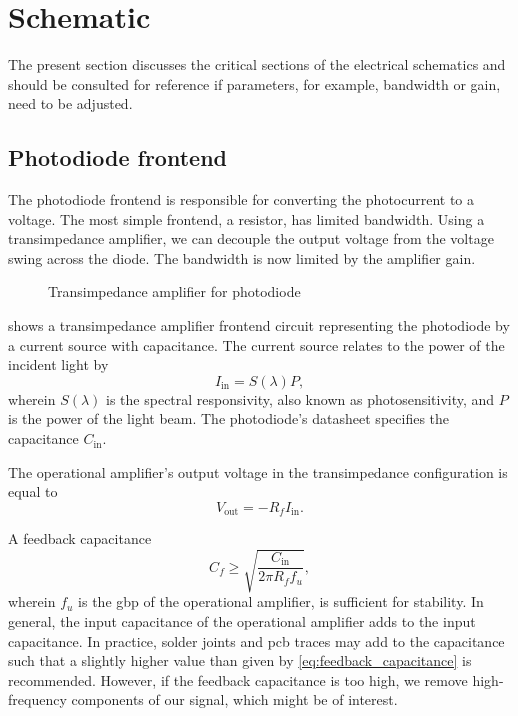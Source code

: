 \section{Schematic}

The present section discusses the critical sections of the electrical schematics and should be consulted for reference if parameters, for example, bandwidth or gain, need to be adjusted.

\subsection{Photodiode frontend}

The photodiode frontend is responsible for converting the photocurrent to a voltage.
The most simple frontend, a resistor, has limited bandwidth.
Using a transimpedance amplifier, we can decouple the output voltage from the voltage swing across the diode.
The bandwidth is now limited by the amplifier gain.

\begin{figure}[H]
	\centering
	
 	\caption{Transimpedance amplifier for photodiode}\label{fig:transimpedance_amplifier}
\end{figure}

 shows a transimpedance amplifier frontend circuit representing the photodiode by a current source with capacitance.
The current source relates to the power of the incident light by
\begin{equation}
I_\text{in} = S(\lambda) P,
\end{equation}
wherein $S(\lambda)$ is the spectral responsivity, also known as photosensitivity, and $P$ is the power of the light beam.
The photodiode's datasheet specifies the capacitance $C_\text{in}$.

The operational amplifier's output voltage in the transimpedance configuration is equal to
\begin{equation}
	V_\text{out} = - R_f I_\text{in}.
\end{equation}

A feedback capacitance
\begin{equation}
	C_f\geq\sqrt{\frac{C_\text{in}}{2\pi R_f f_u}},
	\label{eq:feedback_capacitance}
\end{equation}
wherein $f_u$ is the \gls{gbp} of the operational amplifier,
 is sufficient for stability.
 In general, the input capacitance of the operational amplifier adds to the input capacitance.
 In practice, solder joints and \gls{pcb} traces may add to the capacitance such that a slightly higher value than given by \eqref{eq:feedback_capacitance} is recommended.
 However, if the feedback capacitance is too high, we remove high-frequency components of our signal, which might be of interest.

